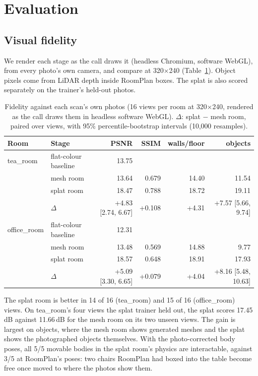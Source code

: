 \documentclass[sigconf,review,anonymous]{acmart}
\newcommand{\measured}[1]{#1}
\begin{document}
\section{Evaluation}
\subsection{Visual fidelity}
We render each stage as the call draws it (headless Chromium, software WebGL), from every photo's
own camera, and compare at 320$\times$240 (Table~\ref{tab:fidelity}). Object pixels come from
LiDAR depth inside RoomPlan boxes. The splat is also scored separately on the trainer's held-out
photos.
\begin{table}[t]
\caption{Fidelity against each scan's own photos (16 views per room at 320$\times$240, rendered as
the call draws them in headless software WebGL). $\Delta$: splat $-$ mesh room, paired over views,
with 95\% percentile-bootstrap intervals (10{,}000 resamples).}
\label{tab:fidelity}
\begin{tabular}{llrrrr}
\toprule
Room & Stage & PSNR & SSIM & walls/floor & objects \\
\midrule
tea\_room & flat-colour baseline & \measured{13.75} & & & \\
 & mesh room & \measured{13.64} & \measured{0.679} & \measured{14.40} & \measured{11.54} \\
 & splat room & \measured{18.47} & \measured{0.788} & \measured{18.72} & \measured{19.11} \\
 & $\Delta$ & \measured{+4.83} [2.74, 6.67] & \measured{+0.108} & \measured{+4.31} & \measured{+7.57} [5.66, 9.74] \\
\midrule
office\_room & flat-colour baseline & \measured{12.31} & & & \\
 & mesh room & \measured{13.48} & \measured{0.569} & \measured{14.88} & \measured{9.77} \\
 & splat room & \measured{18.57} & \measured{0.648} & \measured{18.91} & \measured{17.93} \\
 & $\Delta$ & \measured{+5.09} [3.30, 6.65] & \measured{+0.079} & \measured{+4.04} & \measured{+8.16} [5.48, 10.63] \\
\bottomrule
\end{tabular}
\end{table}
The splat room is better in 14 of 16 (tea\_room) and 15 of 16 (office\_room) views. On tea\_room's
four views the splat trainer held out, the splat scores \measured{17.45\,dB} against
\measured{11.66\,dB} for the mesh room on its two unseen views. The gain is largest on objects,
where the mesh room shows generated meshes and the splat shows the photographed objects
themselves. With the photo-corrected body poses, all \measured{5/5} movable bodies in the splat
room's physics are interactable, against \measured{3/5} at RoomPlan's poses: two chairs RoomPlan
had boxed into the table become free once moved to where the photos show them.
\end{document}
